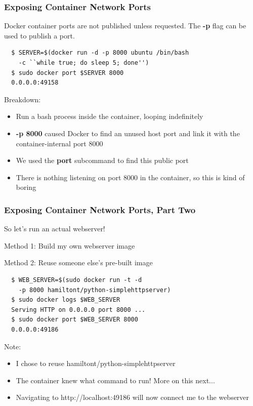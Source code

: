 \documentclass[xcolor=dvipsnames]{beamer}
\begin{document}
\begin{frame}[fragile]
 \frametitle{Exposing Container Network Ports}

  Docker container ports are not published unless requested. The \textbf{-p} flag can be used to 
  publish a port. 

  \begin{lstlisting}
  $ SERVER=$(docker run -d -p 8000 ubuntu /bin/bash 
    -c ``while true; do sleep 5; done'')
  $ sudo docker port $SERVER 8000
  0.0.0.0:49158
  \end{lstlisting}

  Breakdown: 
  \begin{itemize}
  \item Run a bash process inside the container, looping indefinitely
  \item \textbf{-p 8000} caused Docker to find an unused host port and link it with the container-internal port 8000
  \item We used the \textbf{port} subcommand to find this public port
  \item There is nothing listening on port 8000 in the container, so this is 
  kind of boring
  \end{itemize}


\end{frame}


\begin{frame}[fragile]
 \frametitle{Exposing Container Network Ports, Part Two}

  So let's run an actual webserver! 
  
    Method 1: Build my own webserver image
  
    Method 2: Reuse someone else's pre-built image
  
  \begin{lstlisting}
  $ WEB_SERVER=$(sudo docker run -t -d 
    -p 8000 hamiltont/python-simplehttpserver)
  $ sudo docker logs $WEB_SERVER
  Serving HTTP on 0.0.0.0 port 8000 ...
  $ sudo docker port $WEB_SERVER 8000
  0.0.0.0:49186
  \end{lstlisting}

  Note: 
  \begin{itemize}
  \item I chose to reuse hamiltont/python-simplehttpserver
  \item The container knew what command to run! More on this next...
  \item Navigating to http://localhost:49186 will now connect me to the webserver
  \end{itemize}

\end{frame}
\end{document}
